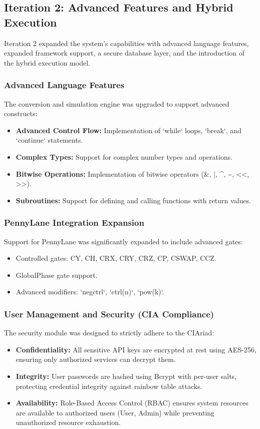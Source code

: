 \subsection{Iteration 2: Advanced Features and Hybrid Execution}

Iteration 2 expanded the system's capabilities with advanced language features, expanded framework support, a secure database layer, and the introduction of the hybrid execution model.



\subsubsection{Advanced Language Features}
The conversion and simulation engine was upgraded to support advanced constructs:
\begin{itemize}
    \item \textbf{Advanced Control Flow:} Implementation of `while` loops, `break`, and `continue` statements.
    \item \textbf{Complex Types:} Support for complex number types and operations.
    \item \textbf{Bitwise Operations:} Implementation of bitwise operators (\&, |, \textasciicircum, \textasciitilde, <<, >>).
    \item \textbf{Subroutines:} Support for defining and calling functions with return values.
\end{itemize}

\subsubsection{PennyLane Integration Expansion}
Support for PennyLane was significantly expanded to include advanced gates:
\begin{itemize}
    \item Controlled gates: CY, CH, CRX, CRY, CRZ, CP, CSWAP, CCZ.
    \item GlobalPhase gate support.
    \item Advanced modifiers: `negctrl`, `ctrl(n)`, `pow(k)`.
\end{itemize}

\subsubsection{User Management and Security (CIA Compliance)}
The security module was designed to strictly adhere to the CIAriad:
\begin{itemize}
    \item \textbf{Confidentiality:} All sensitive API keys are encrypted at rest using AES-256, ensuring only authorized services can decrypt them.
    \item \textbf{Integrity:} User passwords are hashed using Bcrypt with per-user salts, protecting credential integrity against rainbow table attacks.
    \item \textbf{Availability:} Role-Based Access Control (RBAC) ensures system resources are available to authorized users (User, Admin) while preventing unauthorized resource exhaustion.
\end{itemize}

